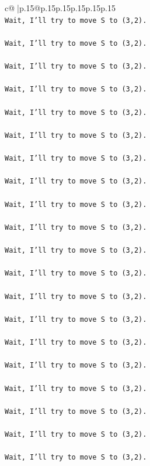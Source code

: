 \documentclass{article}
\begin{document}
{\begin{supertabular}{c@{$\;$}|p{.15\linewidth}@{}p{.15\linewidth}p{.15\linewidth}p{.15\linewidth}p{.15\linewidth}p{.15\linewidth}}
{{{\\ 
\texttt{Wait, I'll try to move S to (3,2).} \\
\\ 
\texttt{Wait, I'll try to move S to (3,2).} \\
\\ 
\texttt{Wait, I'll try to move S to (3,2).} \\
\\ 
\texttt{Wait, I'll try to move S to (3,2).} \\
\\ 
\texttt{Wait, I'll try to move S to (3,2).} \\
\\ 
\texttt{Wait, I'll try to move S to (3,2).} \\
\\ 
\texttt{Wait, I'll try to move S to (3,2).} \\
\\ 
\texttt{Wait, I'll try to move S to (3,2).} \\
\\ 
\texttt{Wait, I'll try to move S to (3,2).} \\
\\ 
\texttt{Wait, I'll try to move S to (3,2).} \\
\\ 
\texttt{Wait, I'll try to move S to (3,2).} \\
\\ 
\texttt{Wait, I'll try to move S to (3,2).} \\
\\ 
\texttt{Wait, I'll try to move S to (3,2).} \\
\\ 
\texttt{Wait, I'll try to move S to (3,2).} \\
\\ 
\texttt{Wait, I'll try to move S to (3,2).} \\
\\ 
\texttt{Wait, I'll try to move S to (3,2).} \\
\\ 
\texttt{Wait, I'll try to move S to (3,2).} \\
\\ 
\texttt{Wait, I'll try to move S to (3,2).} \\
\\ 
\texttt{Wait, I'll try to move S to (3,2).} \\
\\ 
\texttt{Wait, I'll try to move S to (3,2).} \\
}}}
\end{supertabular}}
\end{document}
